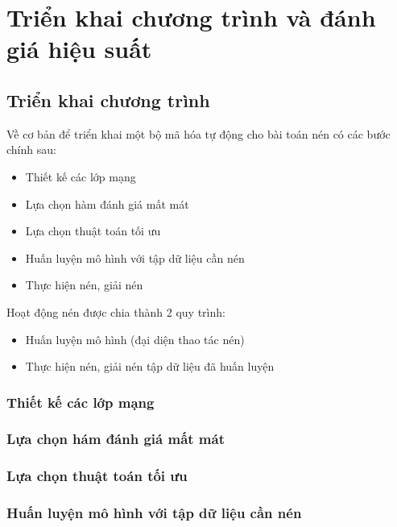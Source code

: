 \chapter{Triển khai chương trình và đánh giá hiệu suất}
\label{cha:chap3}

\section{Triển khai chương trình}
Về cơ bản để triển khai một bộ mã hóa tự động cho bài toán nén 
có các bước chính sau:
\begin{itemize}[leftmargin=1.5cm]
    \item Thiết kế các lớp mạng
    \item Lựa chọn hàm đánh giá mất mát
    \item Lựa chọn thuật toán tối ưu
    \item Huấn luyện mô hình với tập dữ liệu cần nén
    \item Thực hiện nén, giải nén
\end{itemize}

Hoạt động nén được chia thành 2 quy trình:
\begin{itemize}[leftmargin=1.5cm]
    \item Huấn luyện mô hình (đại diện thao tác nén)
    \item Thực hiện nén, giải nén tập dữ liệu đã huấn luyện
\end{itemize}

\subsection{Thiết kế các lớp mạng}
\subsection{Lựa chọn hám đánh giá mất mát}
\subsection{Lựa chọn thuật toán tối ưu}
\subsection{Huấn luyện mô hình với tập dữ liệu cần nén}
